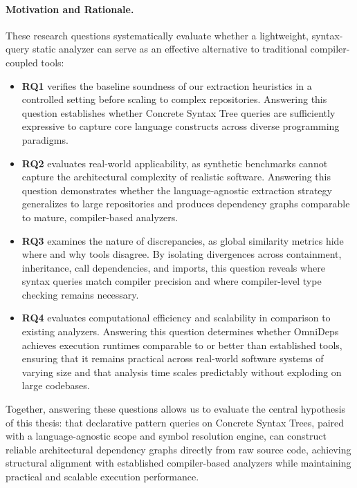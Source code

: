\paragraph{Motivation and Rationale.}
These research questions systematically evaluate whether a
lightweight, syntax-query static analyzer can serve as an effective
alternative to traditional compiler-coupled tools:
\begin{itemize}
  \item \textbf{RQ1} verifies the baseline soundness of our
    extraction heuristics in a controlled setting before scaling to
    complex repositories. Answering this question establishes
    whether Concrete Syntax Tree queries are sufficiently
    expressive to capture core language constructs across diverse
    programming paradigms.
  \item \textbf{RQ2} evaluates real-world applicability, as
    synthetic benchmarks cannot capture the architectural
    complexity of realistic software. Answering this question
    demonstrates whether the language-agnostic extraction strategy
    generalizes to large repositories and produces dependency graphs
    comparable to mature, compiler-based analyzers.
  \item \textbf{RQ3} examines the nature of discrepancies, as
    global similarity metrics hide where and why tools disagree. By
    isolating divergences across containment, inheritance, call
    dependencies, and imports, this question reveals where syntax
    queries match compiler precision and where compiler-level type
    checking remains necessary.
  \item \textbf{RQ4} evaluates computational efficiency and scalability
    in comparison to existing analyzers. Answering this question
    determines whether OmniDeps achieves execution runtimes
    comparable to or better than established tools, ensuring that it
    remains practical across real-world software systems of varying size
    and that analysis time scales predictably without exploding on
    large codebases.
\end{itemize}
Together, answering these questions allows us to evaluate the
central hypothesis of this thesis: that declarative pattern queries on
Concrete Syntax Trees, paired with a language-agnostic scope and symbol
resolution engine, can construct reliable architectural dependency graphs
directly from raw source code, achieving structural alignment with
established compiler-based analyzers while maintaining practical and
scalable execution performance.

